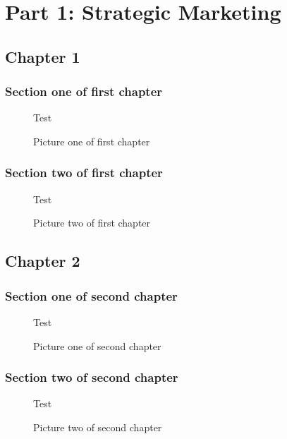 \documentclass[oneside,12pt]{scrbook}
\begin{document}
\dominitoc
\dominilof
\tableofcontents
\fakelistoffigures
\part*{Part 1: Strategic Marketing}
\chapter{Chapter 1}
\minitoc
\minilof
\section{Section one of first chapter}
\lipsum[1]
\begin{figure}
    \centering
    Test
    \caption{Picture one of first chapter}
\end{figure}

\section{Section two of first chapter}
\lipsum[2]
\begin{figure}
    \centering
    Test
    \caption{Picture two of first chapter}
\end{figure}

\chapter{Chapter 2}
\minitoc \minilof

\section{Section one of second chapter}
\lipsum[3]
\begin{figure}
    \centering
    Test
    \caption{Picture one of second chapter}
\end{figure}
\cleardoublepage
\section{Section two of second chapter}
\lipsum[4]
\begin{figure}
    \centering
    Test
    \caption{Picture two of second chapter}
\end{figure}
\end{document}
